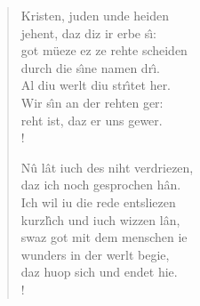 \documentclass[11pt]{article}
\begin{document}
\begin{verse}
\begin{multicols}{2}
\begin{stanza}
Kristen, juden unde heiden\\
jehent, daz diz ir erbe s\^\i:\\
got m\"ueze ez ze rehte scheiden\\
durch die s\^\i ne namen dr\^\i.\\
Al diu werlt diu str\^\i tet her.\\
Wir s\^\i n an der rehten ger:\\
reht ist, daz er uns gewer.\\!
\end{stanza} 
%
%
\begin{stanza}
N\^u l\^at iuch des niht verdriezen,\\
daz ich noch gesprochen h\^an.\\
Ich wil iu die rede entsliezen\\
kurzl\^\i ch und iuch wizzen l\^an,\\
swaz got mit dem menschen ie\\
wunders in der werlt begie,\\
daz huop sich und endet hie.\\!
\end{stanza} 

\end{multicols}

\end{verse}%
\end{document}
